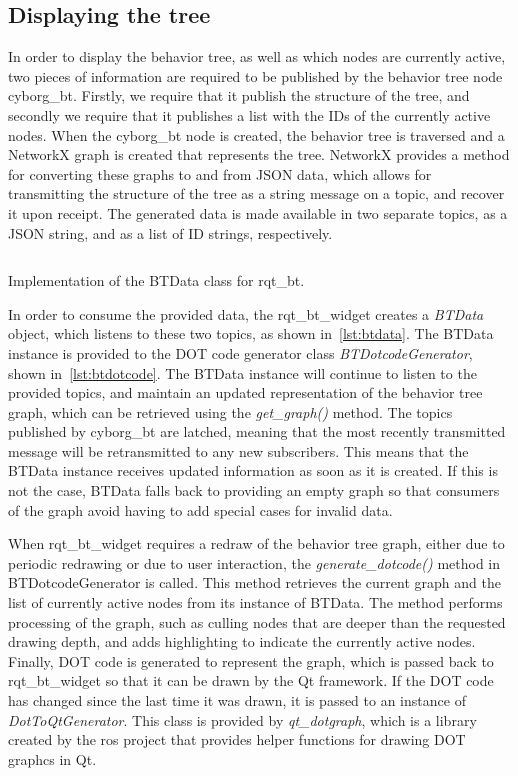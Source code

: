 \documentclass[\rootfolder/main.tex]{subfiles}
\begin{document}
\subsection{Displaying the tree}

In order to display the behavior tree, as well as which nodes are currently active, two pieces of information are required to be published by the behavior tree node cyborg\_bt.
Firstly, we require that it publish the structure of the tree, and secondly we require that it publishes a list with the IDs of the currently active nodes.
When the cyborg\_bt node is created, the behavior tree is traversed and a NetworkX graph is created that represents the tree.
NetworkX provides a method for converting these graphs to and from JSON data, which allows for transmitting the structure of the tree as a string message on a topic, and recover it upon receipt.
The generated data is made available in two separate topics, as a JSON string, and as a list of ID strings, respectively.

\begin{listing}
    \inputminted{python}{\rootfolder/Chapters/Chapter4/Listings/btdata.py}
    \caption{Implementation of the BTData class for rqt\_bt.}
    \label{lst:btdata}
\end{listing}

In order to consume the provided data, the rqt\_bt\_widget creates a \emph{BTData} object, which listens to these two topics, as shown in~\cref{lst:btdata}.
The BTData instance is provided to the DOT code generator class \emph{BTDotcodeGenerator}, shown in~\cref{lst:btdotcode}.
The BTData instance will continue to listen to the provided topics, and maintain an updated representation of the behavior tree graph, which can be retrieved using the \emph{get\_graph()} method.
The topics published by cyborg\_bt are latched, meaning that the most recently transmitted message will be retransmitted to any new subscribers.
This means that the BTData instance receives updated information as soon as it is created.
If this is not the case, BTData falls back to providing an empty graph so that consumers of the graph avoid having to add special cases for invalid data.

When rqt\_bt\_widget requires a redraw of the behavior tree graph, either due to periodic redrawing or due to user interaction, the \emph{generate\_dotcode()} method in BTDotcodeGenerator is called.
This method retrieves the current graph and the list of currently active nodes from its instance of BTData.
The method performs processing of the graph, such as culling nodes that are deeper than the requested drawing depth, and adds highlighting to indicate the currently active nodes.
Finally, DOT code is generated to represent the graph, which is passed back to rqt\_bt\_widget so that it can be drawn by the Qt framework.
If the DOT code has changed since the last time it was drawn, it is passed to an instance of \emph{DotToQtGenerator}.
This class is provided by \emph{qt\_dotgraph}, which is a library created by the \acrshort{ros} project that provides helper functions for drawing DOT graphcs in Qt.
\end{document}
